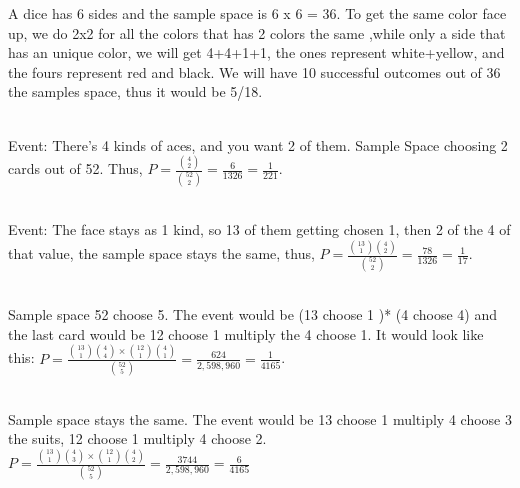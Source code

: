 \documentclass[12pt]{article}
\begin{document}
\begin{enumerate}

A dice has 6 sides and the sample space is 6 x 6 = 36. To get the same color face up, we do 2x2 for all the colors that has 2 colors the same ,while only a side that has an unique color, we will get 4+4+1+1, the ones represent white+yellow, and the fours represent red and black. We will have 10 successful outcomes out of 36 the samples space, thus it would be 5/18. 

\\
Event: There's 4 kinds of aces, and you want 2 of them. Sample Space choosing 2 cards out of 52. Thus, $P = \frac{\binom{4}{2}}{\binom{52}{2}} = \frac{6}{1326} = \frac{1}{221}$.

\\
Event: The face stays as 1 kind, so 13 of them getting chosen 1, then 2 of the 4 of that value, the sample space stays the same, thus, $P = \frac{\binom{13}{1} \binom{4}{2}}{\binom{52}{2}} = \frac{78}{1326} = \frac{1}{17}$. 


\\
Sample space 52 choose 5. The event would be (13 choose 1 )* (4 choose 4) and the last card would be 12 choose 1 multiply the 4 choose 1. It would look like this:
$P = \frac{\binom{13}{1}\binom{4}{4} \times \binom{12}{1}\binom{4}{1}}{\binom{52}{5}} = \frac{624}{2,598,960} = \frac{1}{4165}$. 


\\
Sample space stays the same. The event would be 13 choose 1 multiply 4 choose 3 the suits, 12 choose 1 multiply 4 choose 2. $P = \frac{\binom{13}{1}\binom{4}{3} \times \binom{12}{1}\binom{4}{2}}{\binom{52}{5}} = \frac{3744}{2,598,960} = \frac{6}{4165}$



\end{enumerate}
\end{document}
